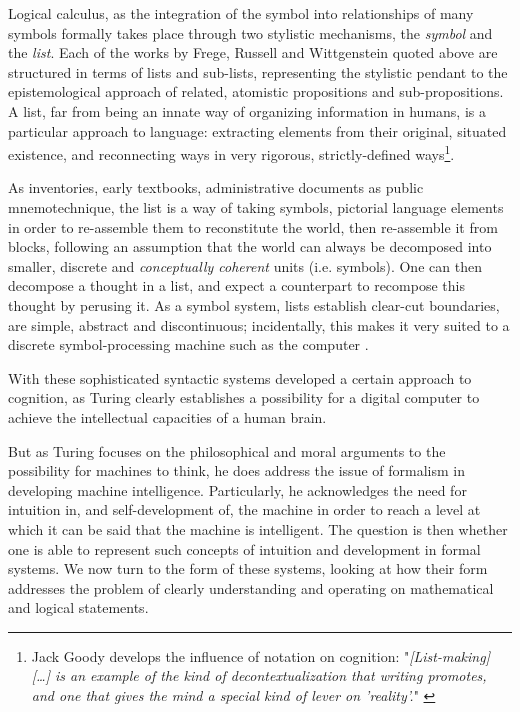 Logical calculus, as the integration of the symbol into relationships of many symbols formally takes place through two stylistic mechanisms, the \emph{symbol} and the \emph{list}. Each of the works by Frege, Russell and Wittgenstein quoted above are structured in terms of lists and sub-lists, representing the stylistic pendant to the epistemological approach of related, atomistic propositions and sub-propositions. A list, far from being an innate way of organizing information in humans, is a particular approach to language: extracting elements from their original, situated existence, and reconnecting ways in very rigorous, strictly-defined ways\footnote{Jack Goody develops the influence of notation on cognition: "\emph{[List-making] [\dots] is an example of the kind of decontextualization that writing promotes, and one that gives the mind a special kind of lever on 'reality'.}" \citep{goody_domestication_1977}}.

As inventories, early textbooks, administrative documents as public mnemotechnique, the list is a way of taking symbols, pictorial language elements in order to re-assemble them to reconstitute the world, then re-assemble it from blocks, following an assumption that the world can always be decomposed into smaller, discrete and \emph{conceptually coherent} units (i.e. symbols). One can then decompose a thought in a list, and expect a counterpart to recompose this thought by perusing it. As a symbol system, lists establish clear-cut boundaries, are simple, abstract and discontinuous; incidentally, this makes it very suited to a discrete symbol-processing machine such as the computer \citep{depaz_stylistique_2023}.

With these sophisticated syntactic systems developed a certain approach to cognition, as Turing clearly establishes a possibility for a digital computer to achieve the intellectual capacities of a human brain.

But as Turing focuses on the philosophical and moral arguments to the possibility for machines to think, he does address the issue of formalism in developing machine intelligence. Particularly, he acknowledges the need for intuition in, and self-development of, the machine in order to reach a level at which it can be said that the machine is intelligent. The question is then whether one is able to represent such concepts of intuition and development in formal systems. We now turn to the form of these systems, looking at how their form addresses the problem of clearly understanding and operating on mathematical and logical statements.

